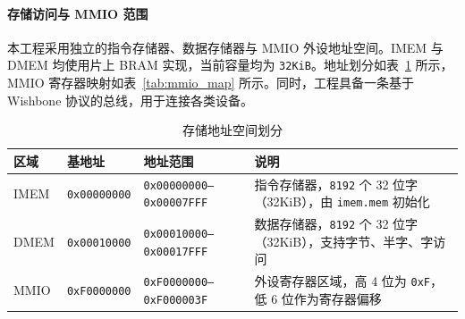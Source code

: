 ﻿\documentclass[12pt,a4paper]{ctexart}
\begin{document}
\paragraph{存储访问与 MMIO 范围}
    本工程采用独立的指令存储器、数据存储器与 MMIO 外设地址空间。IMEM 与 DMEM 均使用片上 BRAM 实现，当前容量均为 \texttt{32KiB}。地址划分如表~\ref{tab:mem_map} 所示，MMIO 寄存器映射如表~\ref{tab:mmio_map} 所示。同时，工程具备一条基于 Wishbone 协议的总线，用于连接各类设备。

    \begin{table}[H]
        \centering
        \caption{存储地址空间划分}
        \label{tab:mem_map}
        \begin{tabularx}{\textwidth}{lllX}
            \toprule
            区域 & 基地址 & 地址范围 & 说明 \\
            \midrule
            IMEM
            & \texttt{0x00000000}
            & \texttt{0x00000000--0x00007FFF}
            & 指令存储器，\texttt{8192} 个 32 位字（32KiB），由 \texttt{imem.mem} 初始化 \\

            DMEM
            & \texttt{0x00010000}
            & \texttt{0x00010000--0x00017FFF}
            & 数据存储器，\texttt{8192} 个 32 位字（32KiB），支持字节、半字、字访问 \\

            MMIO
            & \texttt{0xF0000000}
            & \texttt{0xF0000000--0xF000003F}
            & 外设寄存器区域，高 4 位为 \texttt{0xF}，低 6 位作为寄存器偏移 \\
            \bottomrule
        \end{tabularx}
    \end{table}
\end{document}

